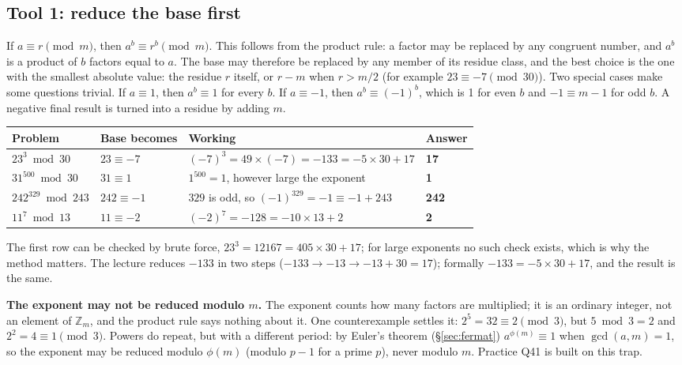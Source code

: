 \subsection{Tool 1: reduce the base first}
If $a \equiv r \pmod m$, then $a^b \equiv r^b \pmod m$. This follows from the product rule: a factor may be replaced by any congruent number, and $a^b$ is a product of $b$ factors equal to $a$. The base may therefore be replaced by any member of its residue class, and the best choice is the one with the smallest absolute value: the residue $r$ itself, or $r - m$ when $r > m/2$ (for example $23 \equiv -7 \pmod{30}$). Two special cases make some questions trivial. If $a \equiv 1$, then $a^b \equiv 1$ for every $b$. If $a \equiv -1$, then $a^b \equiv (-1)^b$, which is 1 for even $b$ and $-1 \equiv m - 1$ for odd $b$. A negative final result is turned into a residue by adding $m$.
\begin{center}\small
\begin{tabularx}{\textwidth}{@{}l l X l@{}}
\toprule
Problem & Base becomes & Working & Answer\\
\midrule
$23^3 \bmod 30$ & $23 \equiv -7$ & $(-7)^3 = 49 \times (-7) = -133 = -5 \times 30 + 17$ & \textbf{17}\\
$31^{500} \bmod 30$ & $31 \equiv 1$ & $1^{500} = 1$, however large the exponent & \textbf{1}\\
$242^{329} \bmod 243$ & $242 \equiv -1$ & $329$ is odd, so $(-1)^{329} = -1 \equiv -1 + 243$ & \textbf{242}\\
$11^{7} \bmod 13$ & $11 \equiv -2$ & $(-2)^7 = -128 = -10 \times 13 + 2$ & \textbf{2}\\
\bottomrule
\end{tabularx}
\end{center}
The first row can be checked by brute force, $23^3 = 12167 = 405 \times 30 + 17$; for large exponents no such check exists, which is why the method matters. The lecture reduces $-133$ in two steps ($-133 \to -13 \to -13 + 30 = 17$); formally $-133 = -5 \times 30 + 17$, and the result is the same.

\textbf{The exponent may not be reduced modulo $m$.} The exponent counts how many factors are multiplied; it is an ordinary integer, not an element of $\mathbb{Z}_m$, and the product rule says nothing about it. One counterexample settles it: $2^5 = 32 \equiv 2 \pmod 3$, but $5 \bmod 3 = 2$ and $2^2 = 4 \equiv 1 \pmod 3$. Powers do repeat, but with a different period: by Euler's theorem (\S\ref{sec:fermat}) $a^{\phi(m)} \equiv 1$ when $\gcd(a, m) = 1$, so the exponent may be reduced modulo $\phi(m)$ (modulo $p - 1$ for a prime $p$), never modulo $m$. Practice Q41 is built on this trap.

